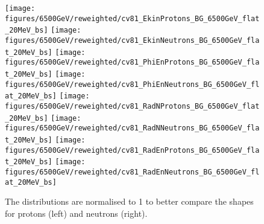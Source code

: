 \begin{figure}
\begin{center}
  \texttt{[image: figures/6500GeV/reweighted/cv81\_EkinProtons\_BG\_6500GeV\_flat\_20MeV\_bs]}
  \texttt{[image: figures/6500GeV/reweighted/cv81\_EkinNeutrons\_BG\_6500GeV\_flat\_20MeV\_bs]}
  \texttt{[image: figures/6500GeV/reweighted/cv81\_PhiEnProtons\_BG\_6500GeV\_flat\_20MeV\_bs]}
  \texttt{[image: figures/6500GeV/reweighted/cv81\_PhiEnNeutrons\_BG\_6500GeV\_flat\_20MeV\_bs]}
  \texttt{[image: figures/6500GeV/reweighted/cv81\_RadNProtons\_BG\_6500GeV\_flat\_20MeV\_bs]}
  \texttt{[image: figures/6500GeV/reweighted/cv81\_RadNNeutrons\_BG\_6500GeV\_flat\_20MeV\_bs]}
  \texttt{[image: figures/6500GeV/reweighted/cv81\_RadEnProtons\_BG\_6500GeV\_flat\_20MeV\_bs]}
  \texttt{[image: figures/6500GeV/reweighted/cv81\_RadEnNeutrons\_BG\_6500GeV\_flat\_20MeV\_bs]}
\end{center}
\vspace{-0.6cm}
 \caption{The distributions are normalised to 1 to better compare the shapes for protons (left) and neutrons (right).
  \label{reweighted2}} 
\end{figure}
